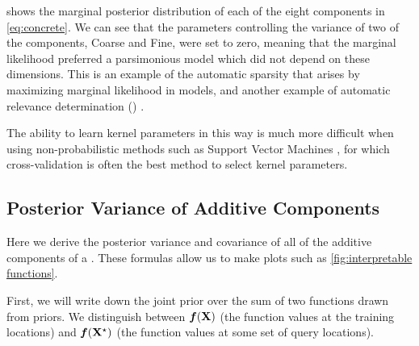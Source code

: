  shows the marginal posterior distribution of each of the eight components in \cref{eq:concrete}.
We can see that the parameters controlling the variance of two of the components, Coarse and Fine, were set to zero, meaning that the marginal likelihood preferred a parsimonious model which did not depend on these dimensions.
This is an example of the automatic sparsity that arises by maximizing marginal likelihood in \gp{} models, and another example of automatic relevance determination (\ARD) \citep{neal1995bayesian}.

The ability to learn kernel parameters in this way is much more difficult when using non-probabilistic methods such as Support Vector Machines \citep{cortes1995support}, for which cross-validation is often the best method to select kernel parameters.



\subsection{Posterior Variance of Additive Components}
\label{sec:posterior-variance}


Here we derive the posterior variance and covariance of all of the additive components of a \gp{}.
These formulas allow us to make plots such as \cref{fig:interpretable functions}.

First, we will write down the joint prior over the sum of two functions drawn from \gp{} priors.
We distinguish between $\boldsymbol{f}(\mathbf{X})$ (the function values at the training locations) and  $\boldsymbol{f}(\mathbf{X}^\star)$ (the function values at some set of query locations).

